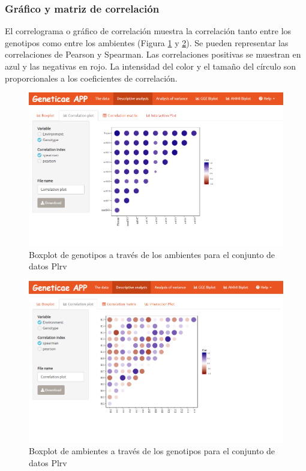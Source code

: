\subsubsection{Gráfico y matriz de correlación}
El correlograma o gráfico de correlación muestra la correlación tanto entre los genotipos como entre los ambientes (Figura \ref{fig:fig45} y \ref{fig:fig46}). Se pueden representar las correlaciones de Pearson y Spearman. Las correlaciones positivas se muestran en azul y las negativas en rojo. La intensidad del color y el tamaño del círculo son proporcionales a los coeficientes de correlación. 


\begin{figure}[H]
	\begin{center}
		\includegraphics[width=14cm]{./Graficos/corr_gen.png}
	\end{center}
	\caption{Boxplot de genotipos a través de los ambientes para el conjunto de datos Plrv}
	\label{fig:fig45}
\end{figure}


\begin{figure}[H]
	\begin{center}
		\includegraphics[width=14cm]{./Graficos/corr_withrep.png}
	\end{center}
	\caption{Boxplot de ambientes a través de los genotipos para el conjunto de datos Plrv}
	\label{fig:fig46}
\end{figure}


